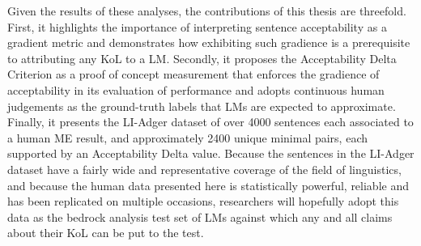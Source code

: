 Given the results of these analyses, the contributions of this thesis are threefold.  First, it highlights the importance of interpreting sentence acceptability as a gradient metric and demonstrates how exhibiting such gradience is a prerequisite to attributing any KoL to a LM.  Secondly, it proposes the Acceptability Delta Criterion as a proof of concept measurement that enforces the gradience of acceptability in its evaluation of performance and adopts continuous human judgements as the ground-truth labels that LMs are expected to approximate.  Finally, it presents the LI-Adger dataset of over 4000 sentences each associated to a human ME result, and approximately 2400 unique minimal pairs, each supported by an Acceptability Delta value.  Because the sentences in the LI-Adger dataset have a fairly wide and representative coverage of the field of linguistics, and because the human data presented here is statistically powerful, reliable and has been replicated on multiple occasions, researchers will hopefully adopt this data as the bedrock analysis test set of LMs against which any and all claims about their KoL can be put to the test.